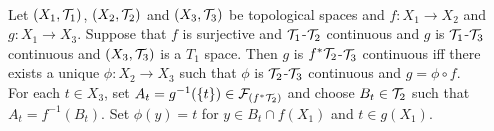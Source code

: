 \documentclass{book}
\begin{document}
	\begin{ex}\lex{}  \\
	Let $(X_1, \mathcal{T}_1)$, $(X_2, \mathcal{T}_2)$ and $(X_3, \mathcal{T}_3)$ be topological spaces and $f: X_1 \rightarrow X_2$ and $g:X_1 \rightarrow X_3$. Suppose that $f$ is surjective and $\mathcal{T}_1$-$\mathcal{T}_2$ continuous and $g$ is $\mathcal{T}_1$-$\mathcal{T}_3$ continuous and $(X_3, \mathcal{T}_3)$ is a $T_1$ space. Then $g$ is $f^*\mathcal{T}_2$-$\mathcal{T}_3$ continuous iff there exists a unique $\phi: X_2 \rightarrow X_3$ such that $\phi$ is $\mathcal{T}_2$-$\mathcal{T}_3$ continuous and $g = \phi \circ f$. \\
	 For each $t \in X_3$, set $A_t = g^{-1}(\{t\}) \in \mathcal{F}_{(f^* \mathcal{T}_2)}$ and choose $B_t \in \mathcal{T}_2$ such that $A_t = f^{-1}(B_t)$. Set $\phi(y) = t$ for $y \in B_t \cap f(X_1)$ and $t \in g(X_1)$.
	\end{ex}
	
\end{document}
